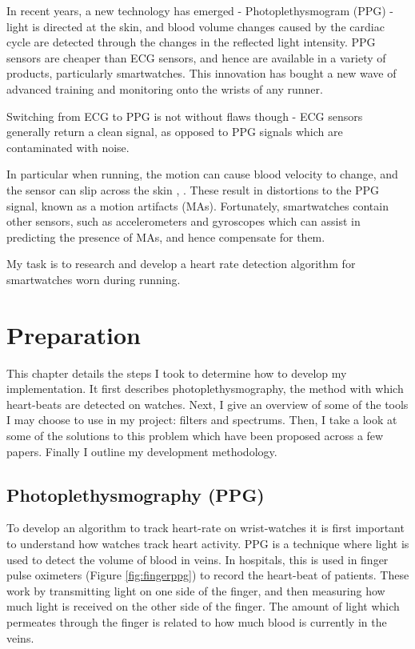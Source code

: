 \documentclass[12pt,a4paper,twoside,openright]{report}
\begin{document}
In recent years, a new technology has emerged - Photoplethysmogram (PPG) 
- light is directed at the skin, and blood volume changes caused by the
cardiac cycle are detected through the changes in the reflected light
intensity. PPG sensors are cheaper than ECG sensors, and hence are 
available in a variety of products, particularly smartwatches. This 
innovation has bought a new wave of advanced training and monitoring onto
the wrists of any runner.

Switching from ECG to PPG is not without flaws though - ECG sensors generally return a
clean signal, as opposed to PPG signals which are contaminated with
noise.

In particular when running, the motion can cause blood velocity to 
change, and the sensor can slip across the skin \cite{Wijshoff17}, 
\cite{Wood06}. These result in distortions to the PPG signal, known as a
motion artifacts (MAs). Fortunately, smartwatches contain other sensors, such
as accelerometers and gyroscopes which can assist in predicting the presence of 
MAs, and hence compensate for them.

My task is to research and develop a heart rate detection algorithm
for smartwatches worn during running. 

\chapter{Preparation}

This chapter details the steps I took to determine how to develop my
implementation. It first describes photoplethysmography, the method with which heart-beats are
detected on watches. Next,
I give an overview of some of the tools I may choose to use in my project:
filters and spectrums. Then, I take a look at some of the solutions to this
problem which have been proposed across a few papers. Finally I outline my
development methodology. 

\section{Photoplethysmography (PPG)}

To develop an algorithm to track heart-rate on wrist-watches it is first important to
understand how watches track heart activity. PPG is a technique where light is
used to detect the volume of blood in veins. In hospitals, this is used in
finger pulse oximeters (Figure \ref{fig:fingerppg}) to record the heart-beat
of patients. These work by transmitting light on one side of the finger, and
then measuring how much light is received on the other side of the finger.
The amount of light which permeates through the finger is related to how much
blood is currently in the veins.
\end{document}
